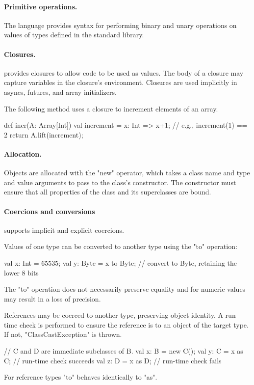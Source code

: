 \paragraph{Primitive operations.}  The language provides syntax for performing
binary and unary operations on values of types defined in the standard library.

\paragraph{Closures.}
\Xten{} provides closures to allow code to be used
as values.  The body of a closure may capture variables in the closure's
environment.  Closures are used implicitly in asyncs, futures, and array
initializers.

The following method uses a closure to increment elements of an array.
\begin{xten}
def incr(A: Array[Int]) {
    val increment = x: Int => x+1; // e.g., increment(1) == 2
    return A.lift(increment);
}
\end{xten}

\paragraph{Allocation.}
Objects are allocated with the \xcd"new" operator, which takes
a class name and type and value arguments to pass to the class's
constructor.  The constructor must ensure that all properties of
the class and its superclasses are bound.

\paragraph{Coercions and conversions}
\Xten{} supports implicit and explicit coercions. 

Values of one type can be converted to another type using the
\xcd"to" operation:
\begin{xten}
val x: Int = 65535;
val y: Byte = x to Byte; // convert to Byte, retaining the lower 8 bits
\end{xten}
The \xcd"to" operation does not necessarily preserve equality
and for numeric values may 
result in a loss of precision.

References may be coerced to another type, preserving object
identity.  A run-time check is performed to ensure the reference
is to an object of the target type.  If not,
\xcd"ClassCastException" is thrown.
\begin{xten}
// C and D are immediate subclasses of B.
val x: B = new C();
val y: C = x as C; // run-time check succeeds
val z: D = x as D; // run-time check fails
\end{xten}
For reference types \xcd"to" behaves identically to \xcd"as".

